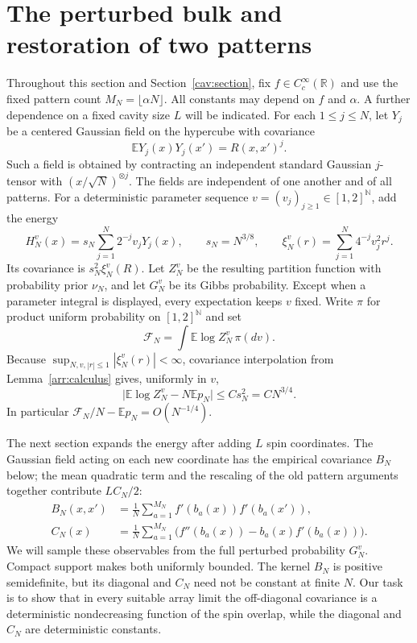 \section{The perturbed bulk and restoration of two patterns}
\label{bulk:section}

Throughout this section and Section~\ref{cav:section}, fix
$f\in C_c^\infty(\mathbb R)$ and use the fixed pattern count
$M_N=\lfloor\alpha N\rfloor$.  All constants may depend on $f$ and
$\alpha$.  A further dependence on a fixed cavity size $L$ will be indicated.
For each $1\le j\le N$, let $Y_j$ be a centered Gaussian field on the
hypercube with covariance
\[
 \mathbb E Y_j(x)Y_j(x')=R(x,x')^j.
\]
Such a field is obtained by contracting an independent standard Gaussian
$j$-tensor with $(x/\sqrt N)^{\otimes j}$.  The fields are independent of
one another and of all patterns.  For a deterministic parameter sequence
$v=(v_j)_{j\ge1}\in[1,2]^{\mathbb N}$, add the energy
\begin{equation}\label{bulk:perturbation}
 H_N^v(x)=s_N\sum_{j=1}^N2^{-j}v_jY_j(x),
 \qquad s_N=N^{3/8},
 \qquad \xi_N^v(r)=\sum_{j=1}^N4^{-j}v_j^2r^j.
\end{equation}
Its covariance is $s_N^2\xi_N^v(R)$.  Let $Z_N^v$ be the resulting
partition function with probability prior $\nu_N$, and let $G_N^v$ be its
Gibbs probability.  Except when a parameter integral is displayed, every
expectation keeps $v$ fixed.  Write $\pi$ for product uniform probability
on $[1,2]^{\mathbb N}$ and set
\begin{equation}\label{bulk:averaged-free-energy}
 \mathcal F_N=\int\mathbb E\log Z_N^v\,\pi(dv).
\end{equation}
Because $\sup_{N,v,|r|\le1}|\xi_N^v(r)|<\infty$, covariance interpolation
from Lemma~\ref{arr:calculus} gives, uniformly in $v$,
\begin{equation}\label{bulk:perturbation-cost}
 \big|\mathbb E\log Z_N^v-N\mathbb E p_N\big|
 \le C s_N^2=C N^{3/4}.
\end{equation}
In particular $\mathcal F_N/N-\mathbb E p_N=O(N^{-1/4})$.

The next section expands the energy after adding $L$ spin coordinates.
The Gaussian field acting on each new coordinate has the empirical
covariance $B_N$ below; the mean quadratic term and the rescaling of
the old pattern arguments together contribute $LC_N/2$:
\begin{align}
 B_N(x,x')&=\frac1N\sum_{a=1}^{M_N}
                f'(b_a(x))f'(b_a(x')), \label{bulk:B}\\
 C_N(x)&=\frac1N\sum_{a=1}^{M_N}
           \bigl(f''(b_a(x))-b_a(x)f'(b_a(x))\bigr).           \label{bulk:C}
\end{align}
We will sample these observables from the full perturbed probability
$G_N^v$.  Compact support makes both uniformly bounded.  The kernel
$B_N$ is positive semidefinite, but its diagonal and $C_N$ need not be
constant at finite $N$.  Our task is to show that in every suitable
array limit the off-diagonal covariance is a deterministic
nondecreasing function of the spin overlap, while the diagonal and
$C_N$ are deterministic constants.

